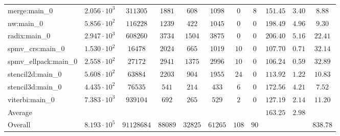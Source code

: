 \begin{tabular}{|l|c|c|c|c|c|c|c|c|c|c|}
merge:main\_0          & $ 2.056 \cdot 10^{3} $ & $ 311305   $ & $ 1881  $ & $ 608   $ & $ 1098  $ & $ 0   $ & $ 8  $ & $ 151.45      $ & $ 3.40    $ & $ 8.88    $ \\
nw:main\_0             & $ 5.856 \cdot 10^{2} $ & $ 116228   $ & $ 1239  $ & $ 422   $ & $ 1045  $ & $ 0   $ & $ 0  $ & $ 198.49      $ & $ 4.96    $ & $ 9.30    $ \\
radix:main\_0          & $ 2.947 \cdot 10^{3} $ & $ 608260   $ & $ 3734  $ & $ 1504  $ & $ 3875  $ & $ 0   $ & $ 0  $ & $ 206.40      $ & $ 5.16    $ & $ 22.41   $ \\
spmv\_crs:main\_0      & $ 1.530 \cdot 10^{2} $ & $ 16478    $ & $ 2024  $ & $ 665   $ & $ 1019  $ & $ 10  $ & $ 0  $ & $ 107.70      $ & $ 0.71    $ & $ 32.14   $ \\
spmv\_ellpack:main\_0  & $ 2.558 \cdot 10^{2} $ & $ 27172    $ & $ 2941  $ & $ 1375  $ & $ 2996  $ & $ 10  $ & $ 0  $ & $ 106.24      $ & $ 0.59    $ & $ 32.89   $ \\
stencil2d:main\_0      & $ 5.608 \cdot 10^{2} $ & $ 63884    $ & $ 2203  $ & $ 904   $ & $ 1955  $ & $ 24  $ & $ 0  $ & $ 113.92      $ & $ 1.22    $ & $ 10.83   $ \\
stencil3d:main\_0      & $ 4.435 \cdot 10^{2} $ & $ 76535    $ & $ 541   $ & $ 214   $ & $ 433   $ & $ 6   $ & $ 0  $ & $ 172.56      $ & $ 4.21    $ & $ 7.52    $ \\
viterbi:main\_0        & $ 7.383 \cdot 10^{3} $ & $ 939104   $ & $ 692   $ & $ 265   $ & $ 529   $ & $ 2   $ & $ 0  $ & $ 127.19      $ & $ 2.14    $ & $ 11.20   $ \\
\hline
Average                & $                    $ & $          $ & $       $ & $       $ & $       $ & $     $ & $    $ & $ 163.25      $ & $ 2.98    $ & $         $ \\
\hline
Overall                & $ 8.193 \cdot 10^{5} $ & $ 91128684 $ & $ 88089 $ & $ 32825 $ & $ 61265 $ & $ 108 $ & $ 90 $ & $             $ & $         $ & $ 838.78  $ \\
\hline
\end{tabular}
